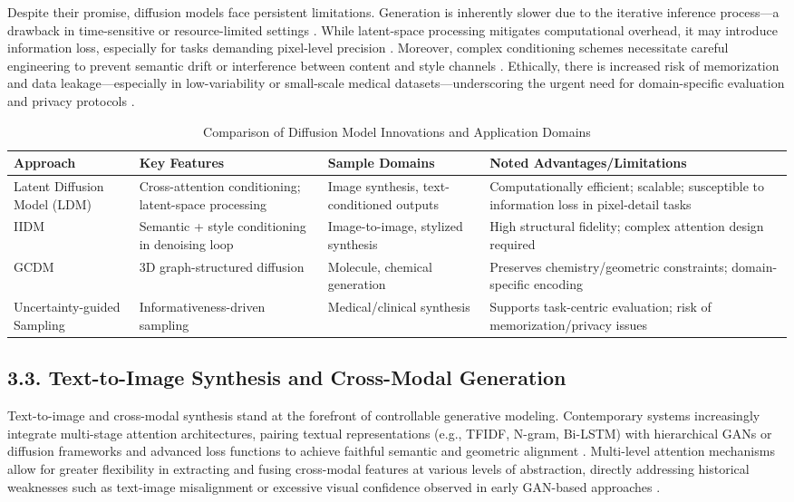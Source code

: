 \documentclass[11pt]{article}
\begin{document}
Despite their promise, diffusion models face persistent limitations. Generation is inherently slower due to the iterative inference process—a drawback in time-sensitive or resource-limited settings \cite{ref73, ref76, ref90}. While latent-space processing mitigates computational overhead, it may introduce information loss, especially for tasks demanding pixel-level precision \cite{ref73, ref76}. Moreover, complex conditioning schemes necessitate careful engineering to prevent semantic drift or interference between content and style channels \cite{ref102}. Ethically, there is increased risk of memorization and data leakage—especially in low-variability or small-scale medical datasets—underscoring the urgent need for domain-specific evaluation and privacy protocols \cite{ref91, ref100}.

\begin{table}[ht]
\centering
\caption{Comparison of Diffusion Model Innovations and Application Domains}
\label{tab:diffusion_summary}
\begin{tabular}{|l|p{3.2cm}|p{3.5cm}|p{4cm}|}
\hline
\textbf{Approach} & \textbf{Key Features} & \textbf{Sample Domains} & \textbf{Noted Advantages/Limitations} \\ \hline
Latent Diffusion Model (LDM) & Cross-attention conditioning; latent-space processing & Image synthesis, text-conditioned outputs & Computationally efficient; scalable; susceptible to information loss in pixel-detail tasks \\ \hline
IIDM & Semantic + style conditioning in denoising loop & Image-to-image, stylized synthesis & High structural fidelity; complex attention design required \\ \hline
GCDM & 3D graph-structured diffusion & Molecule, chemical generation & Preserves chemistry/geometric constraints; domain-specific encoding \\ \hline
Uncertainty-guided Sampling & Informativeness-driven sampling & Medical/clinical synthesis & Supports task-centric evaluation; risk of memorization/privacy issues \\ \hline
\end{tabular}
\end{table}

\subsection{3.3. Text-to-Image Synthesis and Cross-Modal Generation}

Text-to-image and cross-modal synthesis stand at the forefront of controllable generative modeling. Contemporary systems increasingly integrate multi-stage attention architectures, pairing textual representations (e.g., TFIDF, N-gram, Bi-LSTM) with hierarchical GANs or diffusion frameworks and advanced loss functions to achieve faithful semantic and geometric alignment \cite{ref94, ref96}. Multi-level attention mechanisms allow for greater flexibility in extracting and fusing cross-modal features at various levels of abstraction, directly addressing historical weaknesses such as text-image misalignment or excessive visual confidence observed in early GAN-based approaches \cite{ref96}.
\end{document}
